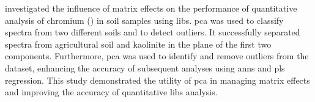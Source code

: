 \citet{sirven_pca_ann_plsr} investigated the influence of matrix effects on the performance of quantitative analysis of chromium () in soil samples using \gls{libs}.
\gls{pca} was used to classify spectra from two different soils and to detect outliers.
It successfully separated spectra from agricultural soil and kaolinite in the plane of the first two components.
Furthermore, \gls{pca} was used to identify and remove outliers from the dataset, enhancing the accuracy of subsequent analyses using \gls{ann}s and \gls{pls} regression.
This study demonstrated the utility of \gls{pca} in managing matrix effects and improving the accuracy of quantitative \gls{libs} analysis.